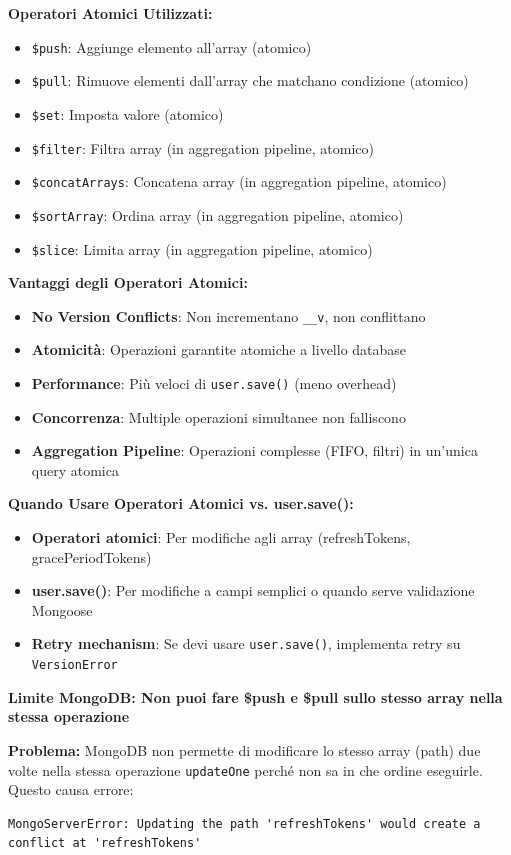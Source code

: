 \documentclass[11pt,a4paper]{article}
\newcommand{\code}[1]{\texttt{#1}}
\newcommand{\important}[1]{\textcolor{red!80!black}{\textbf{#1}}}
\begin{document}
\textbf{Operatori Atomici Utilizzati:}
\begin{itemize}
    \item \code{\$push}: Aggiunge elemento all'array (atomico)
    \item \code{\$pull}: Rimuove elementi dall'array che matchano condizione (atomico)
    \item \code{\$set}: Imposta valore (atomico)
    \item \code{\$filter}: Filtra array (in aggregation pipeline, atomico)
    \item \code{\$concatArrays}: Concatena array (in aggregation pipeline, atomico)
    \item \code{\$sortArray}: Ordina array (in aggregation pipeline, atomico)
    \item \code{\$slice}: Limita array (in aggregation pipeline, atomico)
\end{itemize}

\textbf{Vantaggi degli Operatori Atomici:}
\begin{itemize}
    \item \textbf{No Version Conflicts}: Non incrementano \code{__v}, non conflittano
    \item \textbf{Atomicità}: Operazioni garantite atomiche a livello database
    \item \textbf{Performance}: Più veloci di \code{user.save()} (meno overhead)
    \item \textbf{Concorrenza}: Multiple operazioni simultanee non falliscono
    \item \textbf{Aggregation Pipeline}: Operazioni complesse (FIFO, filtri) in un'unica query atomica
\end{itemize}

\textbf{Quando Usare Operatori Atomici vs. user.save():}
\begin{itemize}
    \item \textbf{Operatori atomici}: Per modifiche agli array (refreshTokens, gracePeriodTokens)
    \item \textbf{user.save()}: Per modifiche a campi semplici o quando serve validazione Mongoose
    \item \textbf{Retry mechanism}: Se devi usare \code{user.save()}, implementa retry su \code{VersionError}
\end{itemize}

\important{Limite MongoDB: Non puoi fare \$push e \$pull sullo stesso array nella stessa operazione}

\textbf{Problema:}
MongoDB non permette di modificare lo stesso array (path) due volte nella stessa operazione \code{updateOne} perché non sa in che ordine eseguirle. Questo causa errore:
\begin{lstlisting}
MongoServerError: Updating the path 'refreshTokens' would create a conflict at 'refreshTokens'
\end{lstlisting}
\end{document}
